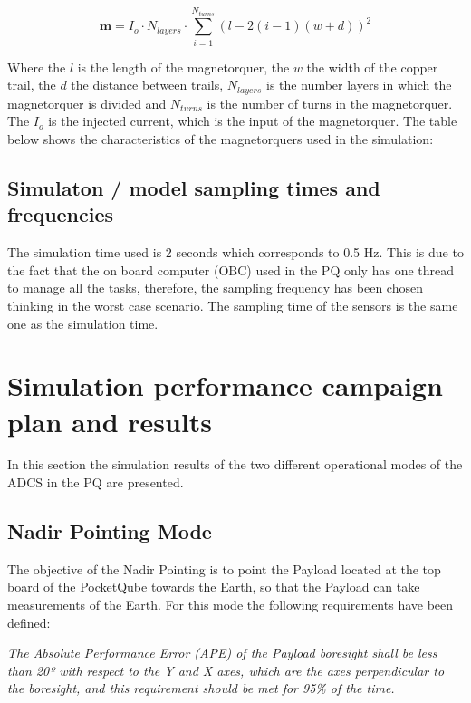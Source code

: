 \begin{equation}
    \boldsymbol{m}=I_o·N_{layers}·\sum_{i=1}^{N_{turns}}(l-2(i-1)(w+d))^2
\end{equation}

\noindent Where the $l$ is the length of the magnetorquer, the $w$ the width of the copper trail, the $d$ the distance between trails, $N_{layers}$ is the number
layers in which the magnetorquer is divided and $N_{turns}$ is the number of turns in the magnetorquer. The $I_o$ is the injected current, which is the input of the magnetorquer. 
The table below shows the characteristics of the magnetorquers used in the simulation:

\magnetorquercharacteristics



\subsection{Simulaton / model sampling times and frequencies}
The simulation time used is 2 seconds which corresponds to 0.5 Hz. This is due to the fact that the on board computer (OBC) used in the PQ
only has one thread to manage all the tasks, therefore, the sampling frequency has been chosen thinking in the worst case scenario. The 
sampling time of the sensors is the same one as the simulation time.

\section{Simulation performance campaign plan and results}

In this section the simulation results of the two different operational modes of the ADCS in the PQ are presented.

\subsection{Nadir Pointing Mode}

The objective of the Nadir Pointing is to point the Payload located at the top board of the PocketQube towards the Earth, so that 
the Payload can take measurements of the Earth. For this mode the following requirements have been defined:

\noindent \textit{The Absolute Performance Error (APE) of the Payload boresight shall be less than 20º with respect to the Y and X 
axes, which are the axes perpendicular to the boresight, and this requirement should be met for 95\% of the time.}

